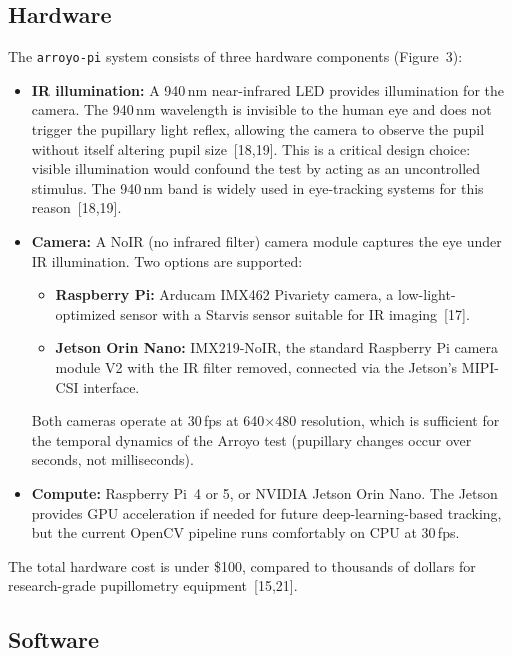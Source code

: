 \documentclass[11pt]{article}
\begin{document}
\subsection{Hardware}

The \texttt{arroyo-pi} system consists of three hardware components
(Figure~3):

\begin{itemize}
  \item \textbf{IR illumination:} A 940\,nm near-infrared LED provides
        illumination for the camera. The 940\,nm wavelength is invisible to
        the human eye and does not trigger the pupillary light reflex,
        allowing the camera to observe the pupil without itself altering
        pupil size~[18,19]. This is a critical design choice: visible
        illumination would confound the test by acting as an uncontrolled
        stimulus. The 940\,nm band is widely used in eye-tracking systems
        for this reason~[18,19].
  \item \textbf{Camera:} A NoIR (no infrared filter) camera module captures
        the eye under IR illumination. Two options are supported:
        \begin{itemize}
          \item \textbf{Raspberry Pi:} Arducam IMX462 Pivariety camera, a
                low-light-optimized sensor with a Starvis sensor suitable
                for IR imaging~[17].
          \item \textbf{Jetson Orin Nano:} IMX219-NoIR, the standard
                Raspberry Pi camera module V2 with the IR filter removed,
                connected via the Jetson's MIPI-CSI interface.
        \end{itemize}
        Both cameras operate at 30\,fps at 640$\times$480 resolution, which
        is sufficient for the temporal dynamics of the Arroyo test (pupillary
        changes occur over seconds, not milliseconds).
  \item \textbf{Compute:} Raspberry Pi~4 or 5, or NVIDIA Jetson Orin Nano.
        The Jetson provides GPU acceleration if needed for future
        deep-learning-based tracking, but the current OpenCV pipeline runs
        comfortably on CPU at 30\,fps.
\end{itemize}

The total hardware cost is under \$100, compared to thousands of dollars for
research-grade pupillometry equipment~[15,21].

\subsection{Software}
\end{document}
